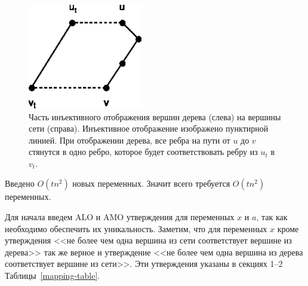 \begin{figure}[t]
  \centering
  \includegraphics[width=5cm]{img/up_var.eps}
  \caption{Часть инъективного отображения вершин дерева (слева) на вершины сети (справа). Инъективное отображение изображено пунктирной линией. При отображении дерева, все ребра на пути от $u$ до $v$ стянутся в одно ребро, которое будет соответствовать ребру из $u_t$ в $v_t$.}
  \label{mapping-example}
\end{figure}

Введено $O(tn^2)$ новых переменных. Значит всего требуется $O(tn^2)$ переменных.

Для начала введем ALO и AMO утверждения для переменных $x$ и $a$, так как необходимо обеспечить их уникальность.
Заметим, что для переменных $x$ кроме утверждения <<не более чем одна вершина из сети соответствует вершине из дерева>> так же верное и утверждение <<не более чем одна вершина из дерева соответствует вершине из сети>>.
Эти утверждения указаны в секциях 1--2 Таблицы~\ref{mapping-table}.

